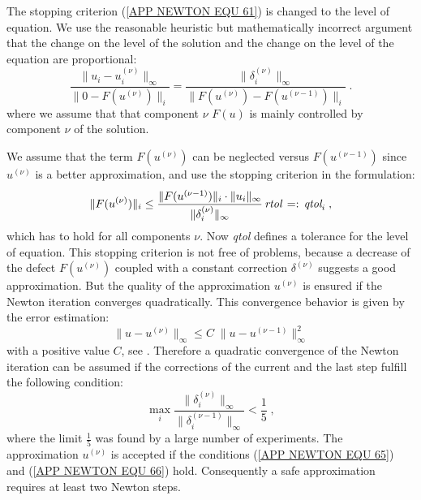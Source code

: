 The stopping criterion (\ref{APP NEWTON EQU 61}) is changed to the level of
equation.  We use the reasonable heuristic but mathematically 
incorrect argument that the change on the level of the solution and
the change on the level of the equation are proportional:
\begin{equation}\label{APP NEWTON EQU 64}
 \frac{ \| u_i - u^{(\nu)}_i \|_{\infty} }{ \| 0 - F(u^{(\nu)}) \|_{i} } =
 \frac{ \| \delta^{(\nu)}_i \|_{\infty} }{ \| F(u^{(\nu)}) - F(u^{(\nu-1)}) \|_{i} }  \; .
\end{equation}
where we assume that that component $\nu$ $F(u)$ is mainly controlled by component $\nu$ of the solution.


We assume that the term $F(u^{(\nu)})$ can be neglected versus
$F(u^{(\nu-1)})$ since $u^{(\nu)}$ is a better approximation,
and use the stopping criterion in the formulation:
\begin{equation} \label{APP NEWTON EQU 65}
        \| F(u^{(\nu)}) \|_i \le
  \frac{ \| F(u^{(\nu-1)})\|_{i} \cdot  \|u_{i} \|_{\infty} }  { \| \delta^{(\nu)}_i \| _{\infty} }
   \,\mbox{\it rtol}\, =:\, \mbox{\it qtol}_i \; ,
\end{equation}
which has to hold for all components $\nu$.
Now {\it qtol} defines a tolerance for the level of equation.  This stopping criterion is not free of problems, because a
decrease of the defect $F(u^{(\nu)})$ coupled with a constant
correction $\delta^{(\nu)}$ suggests a good approximation.
But the quality of the approximation $u^{(\nu)}$ is ensured if the
Newton iteration converges quadratically.  This convergence behavior
is given by the error estimation:
\begin{equation}
    \| u - u^{(\nu)} \|_{\infty} \le C \;
    \| u - u^{(\nu-1)} \|_{\infty}^2
\end{equation}
with a positive value $C$, see \cite{Kelley2004a}.  Therefore a quadratic
convergence of the Newton iteration can be assumed if the corrections
of the current and the last step fulfill the following condition:
\begin{equation} \label{APP NEWTON EQU 66}
  \max_{i}
  \frac{\| \delta^{(\nu)}_i \|_{\infty} }{\| \delta^{(\nu-1)}_i \|_{\infty} } 
                           < \frac{1}{5} \;,
\end{equation}
where the limit $\frac{1}{5}$ was found by a large number of experiments.
The approximation $u^{(\nu)}$ is accepted if the conditions
(\ref{APP NEWTON EQU 65}) and (\ref{APP NEWTON EQU 66}) hold.  Consequently a
safe approximation requires at least two Newton steps.

